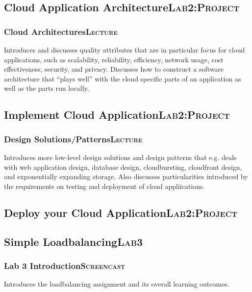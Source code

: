\documentclass[11pt]{article}
\begin{document}
\subsection[Cloud Application Architecture]{Cloud Application Architecture\hfill{}\textsc{Lab2:Project}}
\label{sec-3-7}
\subsubsection[Cloud Architectures]{Cloud Architectures\hfill{}\textsc{Lecture}}
\label{sec-3-7-1}
Introduces and discusses quality attributes that are in particular focus for cloud applications, such as scalability, reliability, efficiency, network usage, cost effectiveness, security, and privacy. Discusses how to construct a software architecture that ``plays well'' with the cloud specific parts of an application as well as the parts run locally.
\subsection[Implement Cloud Application]{Implement Cloud Application\hfill{}\textsc{Lab2:Project}}
\label{sec-3-8}
\subsubsection[Design Solutions/Patterns]{Design Solutions/Patterns\hfill{}\textsc{Lecture}}
\label{sec-3-8-1}
Introduces more low-level design solutions and design patterns that e.g. deals with web application design, database design, cloudbursting, cloudfront design, and exponentially expanding storage.
Also discusses particularities introduced by the requirements on testing and deployment of cloud appliications.
\subsection[Deploy your Cloud Application]{Deploy your Cloud Application\hfill{}\textsc{Lab2:Project}}
\label{sec-3-9}
\subsection[Simple Loadbalancing]{Simple Loadbalancing\hfill{}\textsc{Lab3}}
\label{sec-3-10}
\subsubsection[Lab 3 Introduction]{Lab 3 Introduction\hfill{}\textsc{Screencast}}
\label{sec-3-10-1}
Introduces the loadbalancing assignment and its overall learning outcomes.
\end{document}
